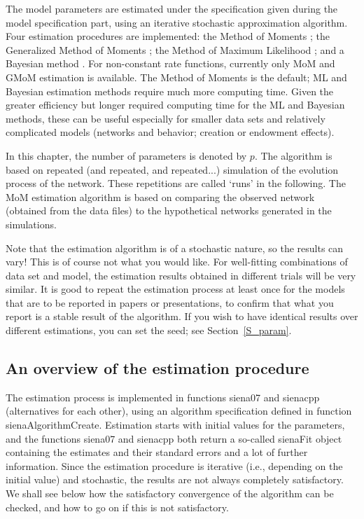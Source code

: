 \documentclass[a4paper,fleqn,11pt]{article}
\newcommand{\+}{\, + \,}
\newcommand{\sfn}[1]{\textsf{#1}}
\begin{document}
The model parameters are estimated under the specification given
during the model specification part, using an iterative stochastic
approximation algorithm.
Four estimation procedures are implemented:
the Method of Moments \citep*[`MoM';][]{Snijders01, SnijdersEA07};
the Generalized Method of Moments \citep*[`GMoM';][]{ASS2015,ASS2019};
 the Method of Maximum Likelihood \citep[`ML';][]{SnijdersEA10a};
 and a Bayesian method
 \citep{Koskinen04, KoskinenSnijders07,SchweinbergerSnijders07c}.
 For non-constant rate functions, currently only
 MoM and GMoM estimation is available.
 The Method of Moments is the default;
 ML and Bayesian estimation methods require much more computing time.
 Given the greater efficiency but longer required computing time
 for the ML and Bayesian methods,
 these can be useful especially for smaller data sets
 and relatively complicated models
 (networks and behavior; creation or endowment effects).

In this chapter, the number of
parameters is denoted by $p$. The algorithm is based on repeated
(and repeated, and repeated...) simulation of the evolution
process of the network. These repetitions are called `runs' in the
following. The MoM estimation algorithm is based on comparing the
observed network (obtained from the data files)
to the hypothetical networks generated in the simulations.

Note that the estimation algorithm is of a stochastic nature, so
the results can vary! This is of course not what you would like.
For well-fitting combinations of data set and model, the
estimation results obtained in different trials will be very
similar. It is good to repeat the estimation process at least once
for the models that are to be reported in papers or presentations,
to confirm that what you report is a stable result of the algorithm.
If you wish to have identical results over different estimations,
you can set the seed; see Section~\ref{S_param}.

\subsection{An overview of the estimation procedure}
\hypertarget{T_S_options}{   }

The estimation process is implemented in functions \sfn{siena07}
and \sfn{sienacpp} (alternatives for each other),
using an algorithm specification defined in function \sfn{sienaAlgorithmCreate}.
Estimation starts with initial values for the parameters,
and the functions \sfn{siena07} and \sfn{sienacpp} both return a
so-called \textsf{sienaFit} object containing the estimates and their standard errors and
a lot of further information.
Since the estimation procedure is iterative (i.e., depending on the
initial value) and stochastic,
the results are not always completely satisfactory. We shall see below
how the satisfactory convergence of the algorithm can be checked,
and how to go on if this is not satisfactory.
\end{document}
